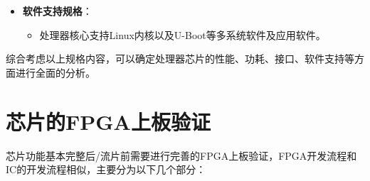 \begin{itemize}
  \begin{itemize}
  \tightlist
  \item
    图像处理单元：在本设计中想要CPU具有视频播放、图片查看等能力，因此加入了JEPG Decoder硬解码单元，支持硬件解码播放720P视频。
  \end{itemize}
\item
  \textbf{软件支持规格}：

  \begin{itemize}
  \tightlist
  \item
    处理器核心支持Linux内核以及U-Boot等多系统软件及应用软件。
  \end{itemize}
\end{itemize}

综合考虑以上规格内容，可以确定处理器芯片的性能、功耗、接口、软件支持等方面进行全面的分析。

\section{芯片的FPGA上板验证}\label{sec:08-verification-and-implementation-003}

芯片功能基本完整后/流片前需要进行完善的FPGA上板验证，FPGA开发流程和IC的开发流程相似，主要分为以下几个部分：

